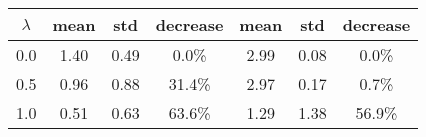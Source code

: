 \begin{tabular}{c||c|c|c||c|c|c}
\toprule
 $\lambda$ &  mean &  std & decrease &  mean &  std & decrease \\
\midrule
       0.0 &  1.40 & 0.49 &    0.0\% &  2.99 & 0.08 &    0.0\% \\
       0.5 &  0.96 & 0.88 &   31.4\% &  2.97 & 0.17 &    0.7\% \\
       1.0 &  0.51 & 0.63 &   63.6\% &  1.29 & 1.38 &   56.9\% \\
\bottomrule
\end{tabular}
